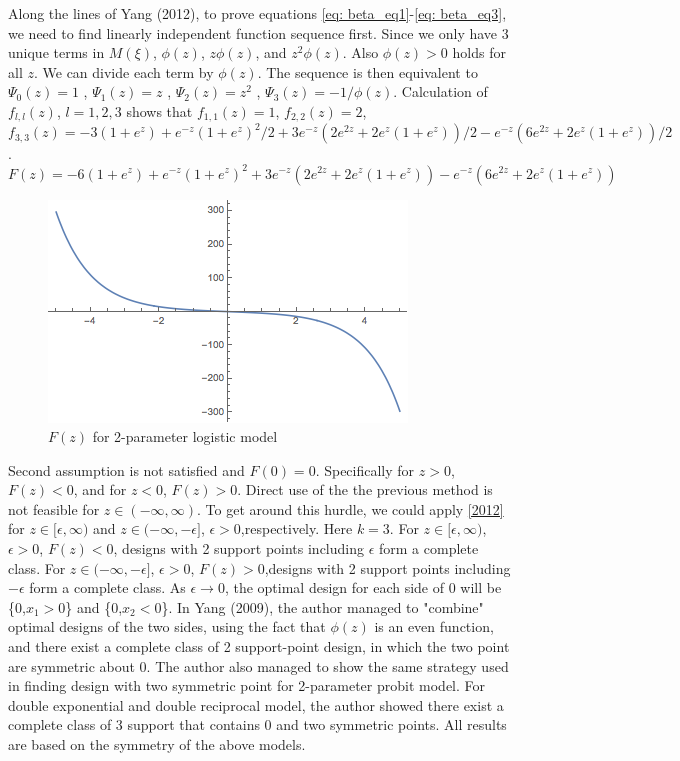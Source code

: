 \documentclass[11pt]{amsart}
\theoremstyle{definition}
\theoremstyle{remark}
\begin{document}
Along the lines of Yang (2012), to prove equations \eqref{eq: beta_eq1}-\eqref{eq: beta_eq3}, we need to find linearly independent function sequence first. Since we only have 3 unique terms in $M(\xi)$, $\phi(z)$, $z\phi(z)$, and $z^2\phi(z)$. Also $\phi(z)>0$ holds for all $z$.  We can divide each term by $\phi(z)$. The sequence is then equivalent to $\Psi_0(z) = 1$ , $\Psi_1(z) = z$ , $\Psi_2(z) = z^2$ , $\Psi_3(z) = -1/\phi(z)$. Calculation of $f_{l,l}(z)$, $l=1,2,3$ shows that $f_{1,1}(z) = 1$, $f_{2,2}(z) = 2$, $f_{3,3}(z) = -3 (1 + e^z) + e^{-z} (1 + e^z)^2/2 + 
 3 e^{-z} (2 e^{2 z} + 2 e^z (1 + e^z))/2 - 
 e^{-z} (6 e^{2 z} + 2 e^z (1 + e^z))/2 $.  \[F(z) = -6 (1 + e^z) + e^{-z} (1 + e^z)^2 + 
 3 e^{-z} (2 e^{2 z} + 2 e^z (1 + e^z)) - 
 e^{-z} (6 e^{2 z} + 2 e^z (1 + e^z))\]
 \begin{figure}[h]
     \centering
     \includegraphics[scale = 0.5]{logistic.png}
     \caption{$F(z)$ for 2-parameter logistic model}
     \label{fig:logistic}
 \end{figure}
 Second assumption is not satisfied and $F(0) = 0$. Specifically for $z>0$, $F(z) <0$, and for $z<0$, $F(z) >0$. Direct use of the the previous method is not feasible for $z\in (-\infty, \infty)$. To get around this hurdle, we could apply \ref{2012} for $z\in[\epsilon, \infty)$ and $z\in(-\infty,-\epsilon]$, $\epsilon>0$,respectively. Here $k=3$. For $z\in[\epsilon, \infty)$, $\epsilon>0$, $F(z)<0$,  designs with 2 support points including $\epsilon$ form a complete class. For $z\in(-\infty,-\epsilon]$, $\epsilon>0$, $F(z)>0$,designs with 2 support points including $-\epsilon$ form a complete class. As $\epsilon\to 0$, the optimal design for each side of $0$ will be \{0,$x_1>0$\} and \{0,$x_2<0$\}. In Yang (2009), the author managed to "combine" optimal designs of the two sides, using the fact that $\phi(z)$ is an even function, and there exist a complete class of 2 support-point design, in which the two point are symmetric about $0$. The author also managed to show the same strategy used in finding design with two symmetric point for 2-parameter probit model. For double exponential and double reciprocal model, the author showed there exist a complete class of 3 support that contains 0 and two symmetric points. All results are based on the symmetry of the above models.
 
\end{document}
